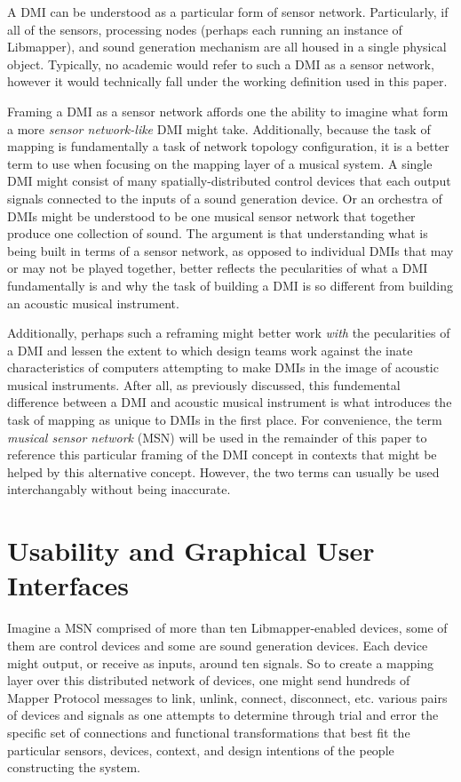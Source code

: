 A DMI can be understood as a particular form of sensor network. Particularly, if all of the sensors, processing nodes (perhaps each running an instance of Libmapper), and sound generation mechanism are all housed in a single physical object. Typically, no academic would refer to such a DMI as a sensor network, however it would technically fall under the working definition used in this paper.

Framing a DMI as a sensor network affords one the ability to imagine what form a more \emph{sensor network-like} DMI might take. Additionally, because the task of mapping is fundamentally a task of network topology configuration, it is a better term to use when focusing on the mapping layer of a musical system. A single DMI might consist of many spatially-distributed control devices that each output signals connected to the inputs of a sound generation device. Or an orchestra of DMIs might be understood to be one musical sensor network that together produce one collection of sound. The argument is that understanding what is being built in terms of a sensor network, as opposed to individual DMIs that may or may not be played together, better reflects the pecularities of what a DMI fundamentally is and why the task of building a DMI is so different from building an acoustic musical instrument.

Additionally, perhaps such a reframing might better work \emph{with} the pecularities of a DMI and lessen the extent to which design teams work against the inate characteristics of computers attempting to make DMIs in the image of acoustic musical instruments. After all, as previously discussed, this fundemental difference between a DMI and acoustic musical instrument is what introduces the task of mapping as unique to DMIs in the first place. For convenience, the term \emph{musical sensor network} (MSN) will be used in the remainder of this paper to reference this particular framing of the DMI concept in contexts that might be helped by this alternative concept. However, the two terms can usually be used interchangably without being inaccurate. 

\section{Usability and Graphical User Interfaces}

Imagine a MSN comprised of more than ten Libmapper-enabled devices, some of them are control devices and some are sound generation devices. Each device might output, or receive as inputs, around ten signals. So to create a mapping layer over this distributed network of devices, one might send hundreds of Mapper Protocol messages to link, unlink, connect, disconnect, etc. various pairs of devices and signals as one attempts to determine through trial and error the specific set of connections and functional transformations that best fit the particular sensors, devices, context, and design intentions of the people constructing the system. 

